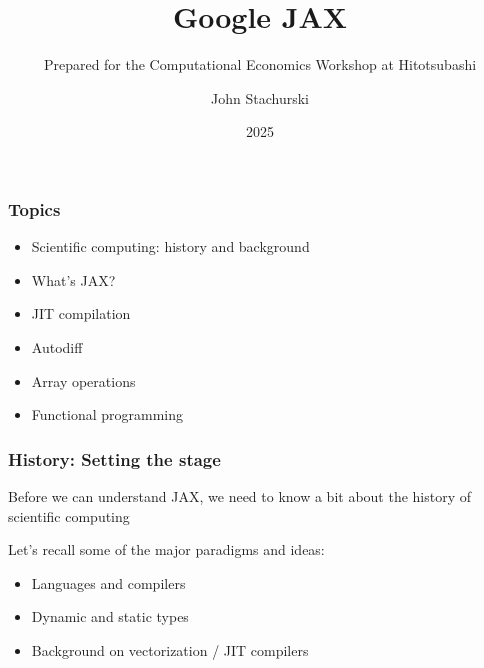 

\title{Google JAX}
\subtitle{Prepared for the Computational Economics Workshop at Hitotsubashi}

\author{John Stachurski}


\date{2025}




\begin{frame}
  \titlepage
\end{frame}



\begin{frame}
    \frametitle{Topics}

    \begin{itemize}
        \item Scientific computing: history and background
        \vspace{0.5em}
        \item What's JAX?
        \vspace{0.5em}
        \item JIT compilation
        \vspace{0.5em}
        \item Autodiff
        \vspace{0.5em}
        \item Array operations
        \vspace{0.5em}
        \item Functional programming
    \end{itemize}

\end{frame}


\begin{frame}
    \frametitle{History: Setting the stage}

    Before we can understand JAX, we need to know a bit about the history of scientific
    computing

    \vspace{0.5em}
    Let's recall some of the major paradigms and ideas:

    \vspace{0.5em}
    \begin{itemize}
        \item Languages and compilers
    \vspace{0.5em}
        \item Dynamic and static types
    \vspace{0.5em}
        \item Background on vectorization / JIT compilers
    \end{itemize}

\end{frame}
    


